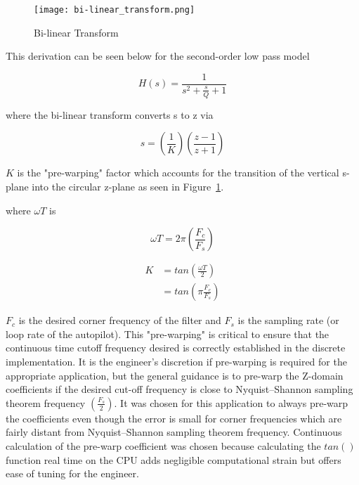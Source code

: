 \begin{figure}[h!]
 \centering
  \texttt{[image: bi-linear\_transform.png]}
  \caption{Bi-linear Transform}
  \label{fig:bi-linear_transform}
\end{figure}

This derivation can be seen below for the second-order low pass model

\begin{equation}
 H(s) = \frac{1}{s^2+\frac{s}{Q}+1}
\end{equation}

where the bi-linear transform converts s to z via

\begin{equation}
 s = \left(\frac{1}{K}\right)\left(\frac{z-1}{z+1}\right)
\end{equation}

$K$ is the "pre-warping" factor which accounts for the transition of the vertical s-plane into the circular z-plane as seen in Figure~\ref{fig:bi-linear_transform}.

where $\omega T$ is

\begin{equation}
 \omega T = 2\pi\left(\frac{F_c}{F_s}\right)
\end{equation}

\begin{equation}
\begin{split}
 K &= tan\left(\frac{\omega T}{2}\right) \\
 &= tan\left(\pi\frac{F_c}{F_s}\right)
\end{split}
\end{equation}



$F_c$ is the desired corner frequency of the filter and $F_s$ is the sampling rate (or loop rate of the autopilot).
This "pre-warping" is critical to ensure that the continuous time cutoff frequency desired is correctly established in the discrete implementation.  It is the engineer's discretion if pre-warping is required for the appropriate application, but the general guidance is to pre-warp the Z-domain coefficients if the desired cut-off frequency is close to Nyquist–Shannon sampling theorem frequency $(\frac{F_s}{2})$.  It was chosen for this application to always pre-warp the coefficients even though the error is small for corner frequencies which are fairly distant from Nyquist–Shannon sampling theorem frequency.  Continuous calculation of the pre-warp coefficient was chosen because calculating the $tan()$ function real time on the CPU adds negligible computational strain but offers ease of tuning for the engineer.

